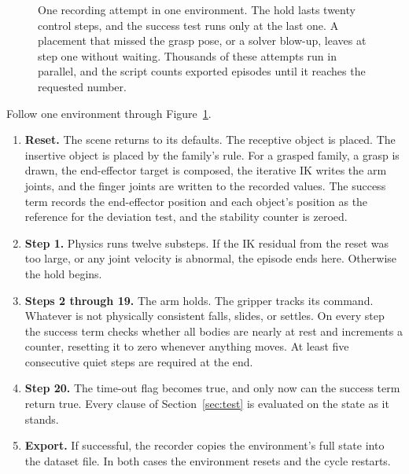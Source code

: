 \documentclass{article}
\begin{document}
\begin{figure}[t]
{}
\caption{One recording attempt in one environment. The hold lasts twenty control steps, and the success test runs only at the last one. A placement that missed the grasp pose, or a solver blow-up, leaves at step one without waiting. Thousands of these attempts run in parallel, and the script counts exported episodes until it reaches the requested number.}
\label{fig:timeline}
\end{figure}

Follow one environment through Figure~\ref{fig:timeline}.
\begin{enumerate}[leftmargin=*, itemsep=2pt]
  \item \textbf{Reset.} The scene returns to its defaults. The receptive object is placed. The insertive object is placed by the family's rule. For a grasped family, a grasp is drawn, the end-effector target is composed, the iterative IK writes the arm joints, and the finger joints are written to the recorded values. The success term records the end-effector position and each object's position as the reference for the deviation test, and the stability counter is zeroed.
  \item \textbf{Step 1.} Physics runs twelve substeps. If the IK residual from the reset was too large, or any joint velocity is abnormal, the episode ends here. Otherwise the hold begins.
  \item \textbf{Steps 2 through 19.} The arm holds. The gripper tracks its command. Whatever is not physically consistent falls, slides, or settles. On every step the success term checks whether all bodies are nearly at rest and increments a counter, resetting it to zero whenever anything moves. At least five consecutive quiet steps are required at the end.
  \item \textbf{Step 20.} The time-out flag becomes true, and only now can the success term return true. Every clause of Section~\ref{sec:test} is evaluated on the state as it stands.
  \item \textbf{Export.} If successful, the recorder copies the environment's full state into the dataset file. In both cases the environment resets and the cycle restarts.
\end{enumerate}
\end{document}
